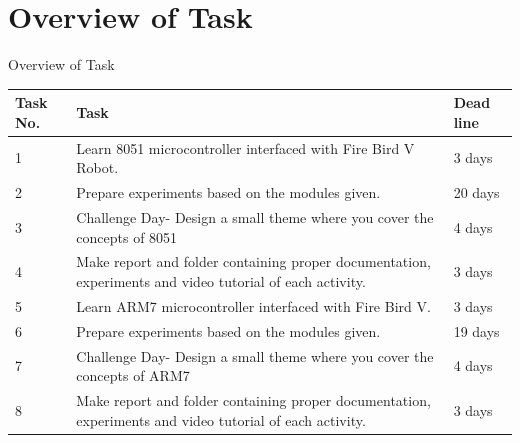 \documentclass[10pt, a4paper]{beamer}
\begin{document}
\section{Overview of Task}
\begin{frame}{Overview of Task}
	\begin{tabular}{|p{.7cm}|p{7.3cm}|p{1.1cm}|}
		\hline
		\textbf{Task No.} & \textbf{Task} & \textbf{Dead line} \\
		\hline
		1 & Learn 8051 microcontroller interfaced with Fire Bird V Robot. & 3 days \\
		\hline
		2 & Prepare experiments based on the  modules  given. & 20 days  \\
		\hline
		3 & Challenge  Day-  Design  a  small  theme  where  you  cover  the 
		concepts of 8051 & 4 days \\
		\hline
		4 & Make report and folder containing proper documentation, experiments 
		and video tutorial of each activity. & 3 days \\
		\hline
		5 & Learn ARM7 microcontroller interfaced with Fire Bird V. & 3 days \\
		\hline
		6 & Prepare experiments based on the  modules  given. & 19 days  \\
		\hline
		7 & Challenge  Day-  Design  a  small  theme  where  you  cover  the 
		concepts of ARM7 & 4 days \\
		\hline
		8 & Make report and folder containing proper documentation, experiments 
		and video tutorial of each activity.& 3 days \\
		\hline
		
		
	\end{tabular}
\end{frame}
\end{document}
